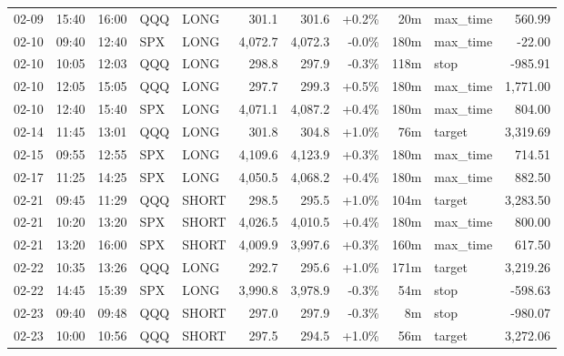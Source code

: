 \documentclass[11pt,a4paper,twoside]{article}
\begin{document}
\begin{center}
\begin{longtable}{>{\color{txtmain}}l l l l l r r r r >{\color{txtmain}}l r}
02-09 & 15:40 & 16:00 & QQQ & LONG & 301.1 & 301.6 & \textcolor{wingreen}{+0.2\%} & 20m & max\_time & \textcolor{wingreen}{560.99} \\
02-10 & 09:40 & 12:40 & SPX & LONG & 4,072.7 & 4,072.3 & \textcolor{lossred}{-0.0\%} & 180m & max\_time & \textcolor{lossred}{-22.00} \\
02-10 & 10:05 & 12:03 & QQQ & LONG & 298.8 & 297.9 & \textcolor{lossred}{-0.3\%} & 118m & stop & \textcolor{lossred}{-985.91} \\
02-10 & 12:05 & 15:05 & QQQ & LONG & 297.7 & 299.3 & \textcolor{wingreen}{+0.5\%} & 180m & max\_time & \textcolor{wingreen}{1,771.00} \\
02-10 & 12:40 & 15:40 & SPX & LONG & 4,071.1 & 4,087.2 & \textcolor{wingreen}{+0.4\%} & 180m & max\_time & \textcolor{wingreen}{804.00} \\
02-14 & 11:45 & 13:01 & QQQ & LONG & 301.8 & 304.8 & \textcolor{wingreen}{+1.0\%} & 76m & target & \textcolor{wingreen}{3,319.69} \\
02-15 & 09:55 & 12:55 & SPX & LONG & 4,109.6 & 4,123.9 & \textcolor{wingreen}{+0.3\%} & 180m & max\_time & \textcolor{wingreen}{714.51} \\
02-17 & 11:25 & 14:25 & SPX & LONG & 4,050.5 & 4,068.2 & \textcolor{wingreen}{+0.4\%} & 180m & max\_time & \textcolor{wingreen}{882.50} \\
02-21 & 09:45 & 11:29 & QQQ & SHORT & 298.5 & 295.5 & \textcolor{wingreen}{+1.0\%} & 104m & target & \textcolor{wingreen}{3,283.50} \\
02-21 & 10:20 & 13:20 & SPX & SHORT & 4,026.5 & 4,010.5 & \textcolor{wingreen}{+0.4\%} & 180m & max\_time & \textcolor{wingreen}{800.00} \\
02-21 & 13:20 & 16:00 & SPX & SHORT & 4,009.9 & 3,997.6 & \textcolor{wingreen}{+0.3\%} & 160m & max\_time & \textcolor{wingreen}{617.50} \\
02-22 & 10:35 & 13:26 & QQQ & LONG & 292.7 & 295.6 & \textcolor{wingreen}{+1.0\%} & 171m & target & \textcolor{wingreen}{3,219.26} \\
02-22 & 14:45 & 15:39 & SPX & LONG & 3,990.8 & 3,978.9 & \textcolor{lossred}{-0.3\%} & 54m & stop & \textcolor{lossred}{-598.63} \\
02-23 & 09:40 & 09:48 & QQQ & SHORT & 297.0 & 297.9 & \textcolor{lossred}{-0.3\%} & 8m & stop & \textcolor{lossred}{-980.07} \\
02-23 & 10:00 & 10:56 & QQQ & SHORT & 297.5 & 294.5 & \textcolor{wingreen}{+1.0\%} & 56m & target & \textcolor{wingreen}{3,272.06} \\

\end{longtable}
\end{center}
\end{document}
